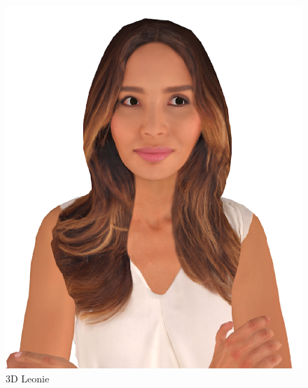 \begin{figure}[hbt!]
    \centering
    \includegraphics[scale=0.5]{pics/AvatarLeonie}
    \caption{3D Leonie}
    \label{fig:impl:leonie}
\end{figure}

